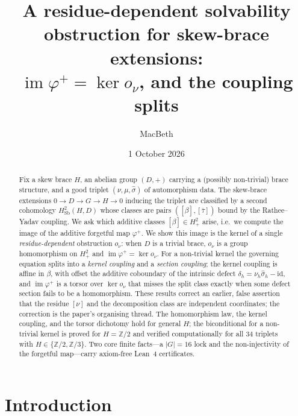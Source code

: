 \documentclass[11pt,reqno]{amsart}
\theoremstyle{plain}
\theoremstyle{definition}
\newcommand{\Sb}{\mathrm{Sb}}
\newcommand{\Z}{\mathbb{Z}}
\newcommand{\id}{\mathrm{id}}
\newcommand{\im}{\operatorname{im}}
\newcommand{\shat}{\widehat{\sigma}}
\begin{document}
\title[A residue-dependent solvability obstruction for skew-brace extensions]
{A residue-dependent solvability obstruction for skew-brace extensions:\\
$\im\varphi^{+}=\ker o_\nu$, and the coupling splits}

\author{MacBeth}
\address{Kodamai}

\date{1 October 2026}

\begin{abstract}
Fix a skew brace $H$, an abelian group $(D,+)$ carrying a (possibly non-trivial) brace
structure, and a good triplet $(\nu,\mu,\shat)$ of automorphism data. The skew-brace
extensions $0\to D\to G\to H\to0$ inducing the triplet are classified by a second
cohomology $H^2_{\Sb}(H,D)$ whose classes are pairs $([\beta],[\bar\tau])$ bound by the
Rathee--Yadav coupling. We ask which additive classes $[\beta]\in H^2_+$ arise, i.e.\ we
compute the image of the additive forgetful map $\varphi^{+}$. We show this image is the
kernel of a single \emph{residue-dependent} obstruction $o_\nu$: when $D$ is a trivial
brace, $o_\nu$ is a group homomorphism on $H^2_+$ and $\im\varphi^{+}=\ker o_\nu$. For a
non-trivial kernel the governing equation splits into a \emph{kernel coupling} and a
\emph{section coupling}; the kernel coupling is affine in $\beta$, with offset the additive
coboundary of the intrinsic defect $\delta_h=\nu_h\widehat\sigma_h-\id$, and
$\im\varphi^{+}$ is a torsor over $\ker o_\nu$ that misses the split class exactly when some
defect section fails to be a homomorphism. These results correct an earlier, false assertion that the
residue $[\nu]$ and the decomposition class are independent coordinates; the correction is
the paper's organising thread. The homomorphism law, the kernel coupling, and the torsor
dichotomy hold for general $H$; the biconditional for a non-trivial kernel is proved for
$H=\Z/2$ and verified computationally for all $34$ triplets with $H\in\{\Z/2,\Z/3\}$. Two
core finite facts---a $|G|=16$ lock and the non-injectivity of the forgetful map---carry
axiom-free Lean~4 certificates.
\end{abstract}

\maketitle

\section{Introduction}\label{sec:intro}
\end{document}
